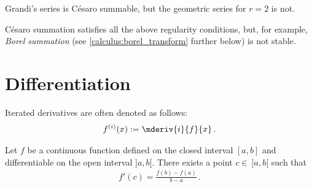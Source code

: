     \begin{remark}
        Grandi's series is C\'esaro summable, but the geometric series for $r=2$ is not.
    \end{remark}

    \begin{remark}
        C\'esaro summation satisfies all the above regularity conditions, but, for example, \textit{Borel summation} (see \cref{calculus:borel_transform} further below) is not stable.
    \end{remark}

\section{Differentiation}

    \begin{notation}
        Iterated derivatives are often denoted as follows:
        \begin{gather}
            f^{(i)}(x) := \mderiv{i}{f}{x}\,.
        \end{gather}
    \end{notation}

    \begin{theorem}\label{calculus:mean_value_theorem}
        Let $f$ be a continuous function defined on the closed interval $[a,b]$ and differentiable on the open interval $]a,b[$. There exists a point $c\in\ ]a,b[$ such that
        \begin{gather}
            f'(c) = \frac{f(b)-f(a)}{b-a}\,.
        \end{gather}
    \end{theorem}

